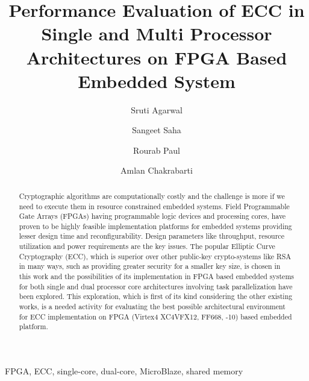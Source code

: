 \documentclass[preprint,12pt]{elsarticle}
\begin{document}
\begin{frontmatter}

\title{Performance Evaluation of ECC in Single and Multi Processor Architectures on FPGA Based Embedded System}

\author{Sruti Agarwal}

\author{Sangeet Saha}
\author{Rourab Paul}
\author{Amlan Chakrabarti}  
                                                     

\address{}


\begin{abstract}

Cryptographic algorithms are computationally costly and the challenge is more if we need to execute them in resource constrained embedded systems. Field Programmable Gate Arrays (FPGAs) having programmable logic devices and processing cores, have proven to be highly feasible implementation platforms for embedded systems providing lesser design time and reconfigurability. Design parameters like throughput, resource utilization and power requirements are the key issues. The popular Elliptic Curve Cryptography (ECC), which is superior over other public-key crypto-systems like RSA in many ways, such as providing greater security for a smaller key size, is chosen in this work and the possibilities of its implementation in FPGA based embedded systems for both single and dual processor core architectures involving task parallelization have been explored. This exploration, which is first of its kind considering the other existing works, is a needed activity for evaluating the best possible architectural environment for ECC implementation on FPGA (Virtex4 XC4VFX12, FF668, -10) based embedded platform. 

\end{abstract}

\begin{keyword}
FPGA, ECC, single-core, dual-core, MicroBlaze, shared memory
\end{keyword}

\end{frontmatter}
\end{document}
